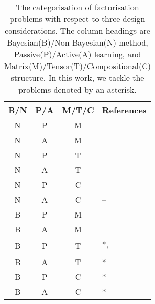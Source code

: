 
\begin{table}[t]
\centering
\caption{\label{tbl:relatedwork}The categorisation of factorisation problems with respect to 
three design considerations. The column headings are Bayesian(B)/Non-Bayesian(N) method, Passive(P)/Active(A) learning, and Matrix(M)/Tensor(T)/Compositional(C) structure. In this work, we tackle the problems denoted by an asterisk.}
\vskip 0.15in
\begin{tabular}{c c c l}
B/N & P/A & M/T/C & References	\\ \hline \hline

N & P & M & \cite{lee1999learning}\\ \hline
N & A & M & \cite{ruchansky2015matrix}\\  \hline

\multirow{2}{*}{N} & \multirow{2}{*}{P} & \multirow{2}{*}{T}& \cite{nickel2011three}\\
& & & \cite{kolda2009tensor}\\ \hline
N & A & T & \cite{kajino2015active} \\  \hline

\multirow{2}{*}{N} & \multirow{2}{*}{P} & \multirow{2}{*}{C} & \cite{Neelakantan2015} \\ 
& & & \cite{guu2015traversing}\\ \hline

N & A & C & -- \\ \hline

B & P & M & \cite{mnih2007probabilistic}\\ \hline

\multirow{2}{*}{B} & \multirow{2}{*}{A} & \multirow{2}{*}{M}&  \cite{kawale2015efficient} \\
& & & \cite{sutherland2013active}\\ \hline

\multirow{2}{*}{B} & \multirow{2}{*}{P} & \multirow{2}{*}{T}& *, \cite{xiong2010temporal}\\
& & & \cite{schmidt2009probabilistic} \\ \hline

B & A & T & * \\ \hline

B & P & C & * \\ \hline

B & A & C & * \\ 
\end{tabular}
\end{table}